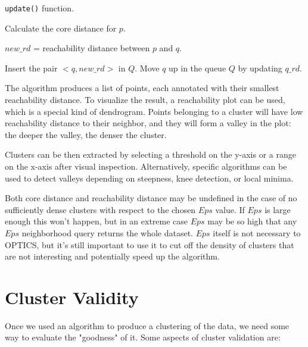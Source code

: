\begin{algorithm}
\caption{\texttt{update()} function.}
\begin{algorithmic}[1]
    \State Calculate the core distance for $p$.

            $new\_rd$ = reachability distance between $p$ and $q$.
        \EndIf

            \State Insert the pair $<q,new\_rd>$ in $Q$.
        \Else
                \State Move $q$ up in the queue $Q$ by updating $q\_rd$.
            \EndIf
        \EndIf
    \EndFor
\end{algorithmic}
\end{algorithm}

The algorithm produces a list of points, each annotated with their smallest reachability distance. To visualize the result, a reachability plot can be used, which is a special kind of dendrogram. Points belonging to a cluster will have low reachability distance to their neighbor, and they will form a valley in the plot: the deeper the valley, the denser the cluster.

Clusters can be then extracted by selecting a threshold on the y-axis or a range on the x-axis after visual inspection. Alternatively, specific algorithms can be used to detect valleys depending on steepness, knee detection, or local minima.

Both core distance and reachability distance may be undefined in the case of no sufficiently dense clusters with respect to the chosen $Eps$ value. If $Eps$ is large enough this won't happen, but in an extreme case $Eps$ may be so high that any $Eps$ neighborhood query returns the whole dataset. $Eps$ itself is not necessary to OPTICS, but it's still important to use it to cut off the density of clusters that are not interesting and potentially speed up the algorithm.

\section{Cluster Validity}

Once we used an algorithm to produce a clustering of the data, we need some way to evaluate the "goodness" of it. Some aspects of cluster validation are:

